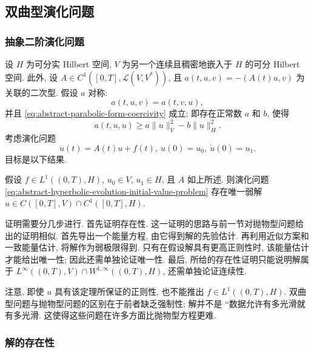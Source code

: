 \subsection{双曲型演化问题}\label{sec:hyperbolic-evolution-problems}

\subsubsection{抽象二阶演化问题}\label{subsec:abstract-second-order-evolution-problems}

设 $H$ 为可分实 Hilbert 空间, $V$ 为另一个连续且稠密地嵌入于 $H$ 的可分 Hilbert 空间. 此外, 设 $A\in C^1([0,T],\mathcal{L}(V,V^*))$, 且 $a(t,u,v)=-(A(t)u,v)$ 为关联的二次型. 假设 $a$ 对称:
\begin{equation}\label{eq:abstract-hyperbolic-form-symmetry}
a(t,u,v)=a(t,v,u),
\end{equation}
并且 \eqref{eq:abstract-parabolic-form-coercivity} 成立; 即存在正常数 $a$ 和 $b$, 使得
\begin{equation}\label{eq:abstract-hyperbolic-form-coercivity}
a(t,u,u)\geq a\|u\|_V^2-b\|u\|_H^2.
\end{equation}
考虑演化问题
\begin{equation}\label{eq:abstract-hyperbolic-evolution-initial-value-problem}
\ddot u(t)=A(t)u+f(t),\ u(0)=u_0,\ \dot u(0)=u_1.
\end{equation}
目标是以下结果.

\begin{Theorem}
\label{thm:abstract-hyperbolic-existence-uniqueness}
假设 $f\in L^1((0,T),H)$, $u_0\in V$, $u_1\in H$, 且 $A$ 如上所述. 则演化问题 \eqref{eq:abstract-hyperbolic-evolution-initial-value-problem} 存在唯一弱解 $u\in C([0,T],V)\cap C^1([0,T],H)$.
\end{Theorem}

证明需要分几步进行. 首先证明存在性. 这一证明的思路与前一节对抛物型问题给出的证明相似. 首先导出一个能量方程, 由它得到解的先验估计. 再利用近似方案和一致能量估计, 将解作为弱极限得到. 只有在假设解具有更高正则性时, 该能量估计才能给出唯一性; 因此还需单独论证唯一性. 最后, 所给的存在性证明只能说明解属于 $L^\infty((0,T),V)\cap W^{1,\infty}((0,T),H)$, 还需单独论证连续性.\par 注意, 即使 $u$ 具有该定理所保证的正则性, 也不能推出 $f\in L^1((0,T),H)$. 双曲型问题与抛物型问题的区别在于前者缺乏强制性; 解并不是 ``数据允许有多光滑就有多光滑\textquotesingle\textquotesingle. 这使得这些问题在许多方面比抛物型方程更难.

\subsubsection{解的存在性}\label{subsec:hyperbolic-solution-existence}

